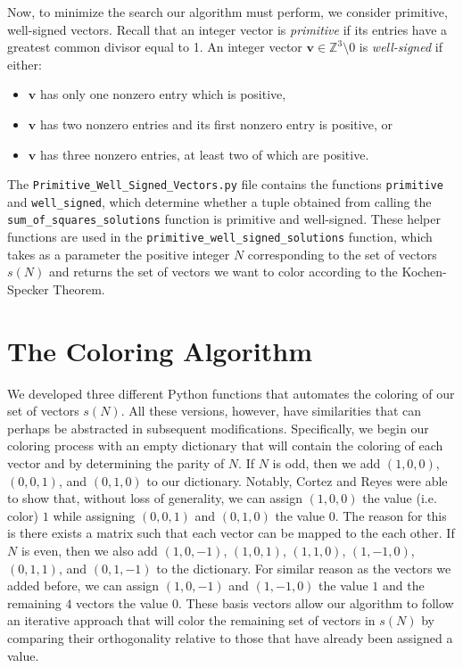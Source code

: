 \documentclass[11pt]{article}
\begin{document}
Now, to minimize the search our algorithm must perform, we consider primitive, well-signed vectors. Recall that an integer vector is \textit{primitive} if its entries have a greatest common divisor equal to 1. An integer vector $\mathbf{v} \in \mathbb{Z}^{3} \setminus 0$ is \textit{well-signed} if either:
\begin{itemize}
	\item $\mathbf{v}$ has only one nonzero entry which is positive,
	\item $\mathbf{v}$ has two nonzero entries and its first nonzero entry is positive, or
	\item $\mathbf{v}$ has three nonzero entries, at least two of which are positive. 
\end{itemize}
The \texttt{Primitive\_Well\_Signed\_Vectors.py} file contains the functions \texttt{primitive} and \texttt{well\_signed}, which determine whether a tuple obtained from calling the \texttt{sum\_of\_squares\_solutions} function is primitive and well-signed. These helper functions are used in the \texttt{primitive\_well\_signed\_solutions} function, which takes as a parameter the positive integer $N$ corresponding to the set of vectors $s(N)$ and returns the set of vectors we want to color according to the Kochen-Specker Theorem.

\section{The Coloring Algorithm}
\hspace{\parindent}We developed three different Python functions that automates the coloring of our set of vectors $s(N)$. All these versions, however, have similarities that can perhaps be abstracted in subsequent modifications. Specifically, we begin our coloring process with an empty dictionary that will contain the coloring of each vector and by determining the parity of $N$. If $N$ is odd, then we add $(1, 0, 0)$, $(0, 0, 1)$, and $(0, 1, 0)$ to our dictionary. Notably, Cortez and Reyes were able to show that, without loss of generality, we can assign $(1, 0, 0)$ the value (i.e. color) $1$ while assigning $(0, 0, 1)$ and $(0, 1, 0)$ the value $0$. The reason for this is there exists a matrix such that each vector can be mapped to the each other. If $N$ is even, then we also add $(1, 0, -1)$, $(1, 0, 1)$, $(1, 1, 0)$, $(1, -1, 0)$, $(0, 1, 1)$, and $(0, 1, -1)$ to the dictionary. For similar reason as the vectors we added before, we can assign $(1, 0, -1)$ and $(1, -1, 0)$ the value $1$ and the remaining $4$ vectors the value $0$. These basis vectors allow our algorithm to follow an iterative approach that will color the remaining set of vectors in $s(N)$ by comparing their orthogonality relative to those that have already been assigned a value.
\end{document}
